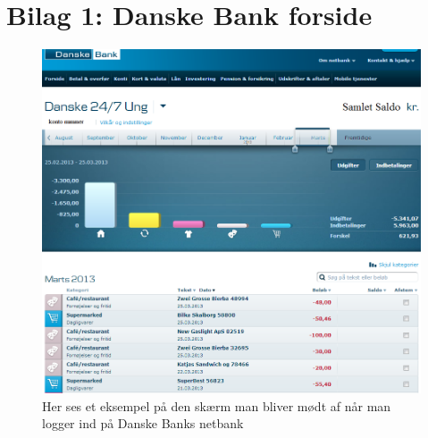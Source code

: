 \chapter*{Bilag 1: Danske Bank forside}
\thispagestyle{empty}
\setcounter{page}{1}
\begin{figure}[H]
\includegraphics [width=\linewidth]{Billeder/bilagdb1.png}
\caption {Her ses et eksempel på den skærm man bliver mødt af når man logger ind på Danske Banks netbank}
\label {bilagdb1}
\end{figure}